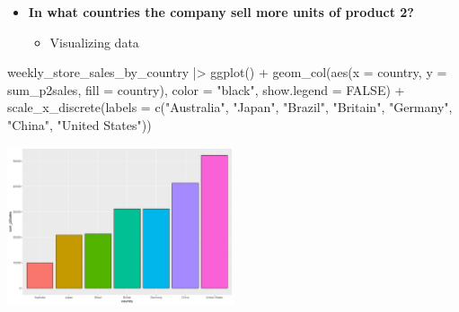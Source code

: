 \documentclass[
  ignorenonframetext,
]{beamer}
\newenvironment{Shaded}{\begin{snugshade}}{\end{snugshade}}
\newcommand{\AttributeTok}[1]{\textcolor[rgb]{0.40,0.45,0.13}{#1}}
\newcommand{\ConstantTok}[1]{\textcolor[rgb]{0.56,0.35,0.01}{#1}}
\newcommand{\FunctionTok}[1]{\textcolor[rgb]{0.28,0.35,0.67}{#1}}
\newcommand{\NormalTok}[1]{\textcolor[rgb]{0.00,0.23,0.31}{#1}}
\newcommand{\SpecialCharTok}[1]{\textcolor[rgb]{0.37,0.37,0.37}{#1}}
\newcommand{\StringTok}[1]{\textcolor[rgb]{0.13,0.47,0.30}{#1}}
\providecommand{\tightlist}{%
  \setlength{\itemsep}{0pt}\setlength{\parskip}{0pt}}\usepackage{longtable,booktabs,array}
\begin{document}
\begin{frame}[fragile]{}
\label{section-34}
\begin{itemize}
\item
  \textbf{In what countries the company sell more units of product 2?}

  \begin{itemize}
  \tightlist
  \item
    Visualizing data
  \end{itemize}
\end{itemize}

\tiny

\begin{Shaded}
\begin{Highlighting}[]
\NormalTok{weekly\_store\_sales\_by\_country }\SpecialCharTok{|\textgreater{}} \FunctionTok{ggplot}\NormalTok{() }\SpecialCharTok{+} 
  \FunctionTok{geom\_col}\NormalTok{(}\FunctionTok{aes}\NormalTok{(}\AttributeTok{x =}\NormalTok{ country, }\AttributeTok{y =}\NormalTok{ sum\_p2sales, }\AttributeTok{fill =}\NormalTok{ country),}
           \AttributeTok{color =} \StringTok{"black"}\NormalTok{, }\AttributeTok{show.legend =} \ConstantTok{FALSE}\NormalTok{) }\SpecialCharTok{+}
  \FunctionTok{scale\_x\_discrete}\NormalTok{(}\AttributeTok{labels =} \FunctionTok{c}\NormalTok{(}\StringTok{"Australia"}\NormalTok{, }\StringTok{"Japan"}\NormalTok{, }\StringTok{"Brazil"}\NormalTok{, }
                              \StringTok{"Britain"}\NormalTok{, }\StringTok{"Germany"}\NormalTok{, }\StringTok{"China"}\NormalTok{, }\StringTok{"United States"}\NormalTok{))}
\end{Highlighting}
\end{Shaded}

\begin{center}
\includegraphics[width=0.5\textwidth,height=\textheight]{003_describing_data_files/figure-beamer/unnamed-chunk-33-1.pdf}
\end{center}
\end{frame}
\end{document}
